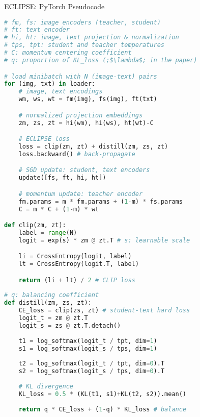 \begin{algorithm}[t!]
\caption{ECLIPSE: PyTorch Pseudocode}
\label{alg:code}
\begin{lstlisting}[language=python,escapeinside=;;]
# fm, fs: image encoders (teacher, student)
# ft: text encoder
# hi, ht: image, text projection & normalization
# tps, tpt: student and teacher temperatures
# C: momentum centering coefficient
# q: proportion of KL_loss (;$\lambda$; in the paper)

# load minibatch with N (image-text) pairs
for (img, txt) in loader:
    # image, text encodings
    wm, ws, wt = fm(img), fs(img), ft(txt)

    # normalized projection embeddings
    zm, zs, zt = hi(wm), hi(ws), ht(wt)-C

    # ECLIPSE loss
    loss = clip(zm, zt) + distill(zm, zs, zt) 
    loss.backward() # back-propagate

    # SGD update: student, text encoders
    update([fs, ft, hi, ht])

    # momentum update: teacher encoder
    fm.params = m * fm.params + (1-m) * fs.params
    C = m * C + (1-m) * wt

def clip(zm, zt):
    label = range(N)
    logit = exp(s) * zm @ zt.T # s: learnable scale

    li = CrossEntropy(logit, label)
    lt = CrossEntropy(logit.T, label)

    return (li + lt) / 2 # CLIP loss
    
# q: balancing coefficient
def distill(zm, zs, zt):
    CE_loss = clip(zs, zt) # student-text hard loss
    logit_t = zm @ zt.T
    logit_s = zs @ zt.T.detach()
    
    t1 = log_softmax(logit_t / tpt, dim=1)
    s1 = log_softmax(logit_s / tps, dim=1)
    
    t2 = log_softmax(logit_t / tpt, dim=0).T
    s2 = log_softmax(logit_s / tps, dim=0).T
    
    # KL divergence
    KL_loss = 0.5 * (KL(t1, s1)+KL(t2, s2)).mean()
    
    return q * CE_loss + (1-q) * KL_loss # balance
\end{lstlisting}
\end{algorithm}
